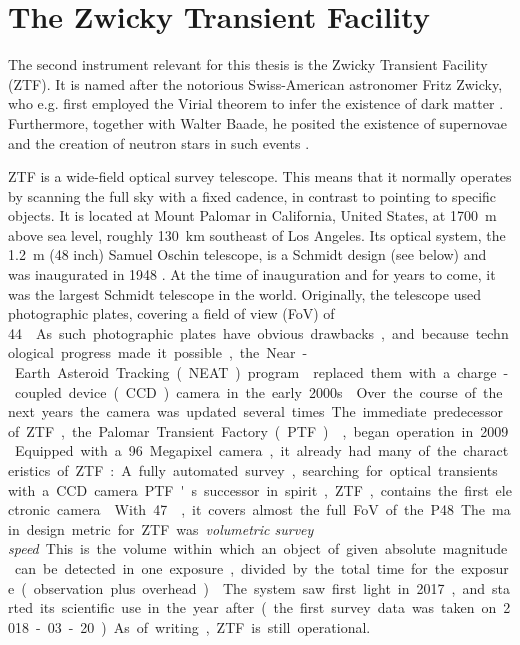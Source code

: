\chapter{The Zwicky Transient Facility} \label{ztf}
The second instrument relevant for this thesis is the Zwicky Transient Facility (ZTF). It is named after the notorious Swiss-American astronomer Fritz Zwicky, who e.g. first employed the Virial theorem to infer the existence of dark matter . Furthermore, together with Walter Baade, he posited the existence of supernovae and the creation of neutron stars in such events .

ZTF is a wide-field optical survey telescope. This means that it normally operates by scanning the full sky with a fixed cadence, in contrast to pointing to specific objects. It is located at Mount Palomar in California, United States, at \SI{1700}{\m} above sea level, roughly \SI{130}{\km} southeast of Los Angeles. Its optical system, the \SI{1.2}{\m} (48 inch) Samuel Oschin telescope, is a Schmidt design (see below) and was inaugurated in 1948 \cite{Harrington1952}. At the time of inauguration and for years to come, it was the largest Schmidt telescope in the world. Originally, the telescope used photographic plates, covering a field of view (FoV) of \SI{44}{\square\deg}. As such photographic plates have obvious drawbacks, and because technological progress made it possible, the Near-Earth Asteroid Tracking (NEAT) program  replaced them with a charge-coupled device (CCD) camera in the early 2000s.

Over the course of the next years the camera was updated several times. The immediate predecessor of ZTF, the Palomar Transient Factory (PTF) , began operation in 2009. Equipped with a 96 Megapixel camera, it already had many of the characteristics of ZTF: A fully automated survey, searching for optical transients with a CCD camera.

PTF's successor in spirit, ZTF, contains the first electronic camera. With \SI{47}{\square\deg}, it covers almost the full FoV of the P48. The main design metric for ZTF was \textit{volumetric survey speed}. This is the volume within which an object of given absolute magnitude can be detected in one exposure, divided by the total time for the exposure (observation plus overhead) . The system saw first light in 2017, and started its scientific use in the year after (the first survey data was taken on 2018-03-20). As of writing, ZTF is still operational.

